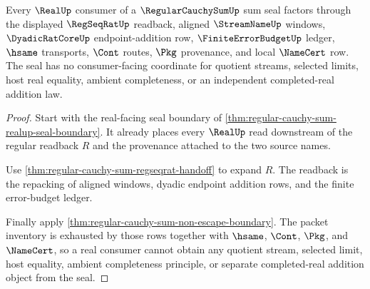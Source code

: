 \begin{theorem}
\label{thm:regular-cauchy-sum-seal-consumer-exhaustion}
Every $\RealUp$ consumer of a $\RegularCauchySumUp$ sum seal factors through the displayed $\RegSeqRatUp$ readback, aligned $\StreamNameUp$ windows, $\DyadicRatCoreUp$ endpoint-addition row, $\FiniteErrorBudgetUp$ ledger, $\hsame$ transports, $\Cont$ routes, $\Pkg$ provenance, and local $\NameCert$ row. The seal has no consumer-facing coordinate for quotient streams, selected limits, host real equality, ambient completeness, or an independent completed-real addition law.
\end{theorem}
\begin{proof}
Start with the real-facing seal boundary of \autoref{thm:regular-cauchy-sum-realup-seal-boundary}. It already places every $\RealUp$ read downstream of the regular readback $R$ and the provenance attached to the two source names.

Use \autoref{thm:regular-cauchy-sum-regseqrat-handoff} to expand $R$. The readback is the repacking of aligned windows, dyadic endpoint addition rows, and the finite error-budget ledger.

Finally apply \autoref{thm:regular-cauchy-sum-non-escape-boundary}. The packet inventory is exhausted by those rows together with $\hsame$, $\Cont$, $\Pkg$, and $\NameCert$, so a real consumer cannot obtain any quotient stream, selected limit, host equality, ambient completeness principle, or separate completed-real addition object from the seal.
\end{proof}


